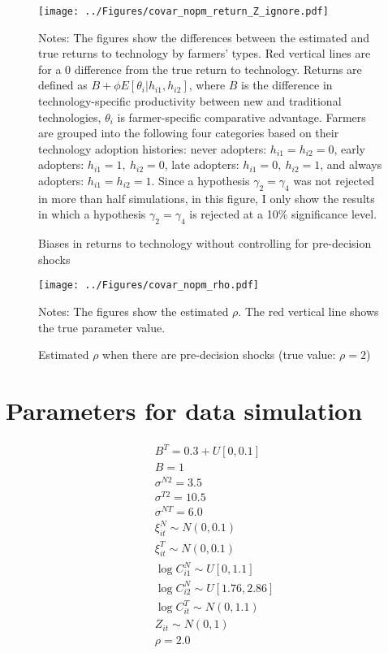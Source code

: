 \documentclass[11pt,letterpaper]{article}
\begin{document}
\begin{figure}[H]
  \centering
  \caption{Biases in returns to technology without controlling for pre-decision shocks}
  \texttt{[image: ../Figures/covar\_nopm\_return\_Z\_ignore.pdf]}
  \label{fig:covar_nopm_return_Z_ignore}
  \footnotesize
  \begin{tablenotes}
    \item Notes:
      The figures show the differences between the estimated and true returns to technology by farmers' types.
      Red vertical lines are for a 0 difference from the true return to technology.
      Returns are defined as $B + \phi E[\theta_i | h_{i1}, h_{i2}]$, where $B$ is the difference in technology-specific productivity between new and traditional technologies, $\theta_i$ is farmer-specific comparative advantage.
      Farmers are grouped into the following four categories based on their technology adoption histories:
      never adopters: $h_{i1} = h_{i2} = 0$, 
      early adopters: $h_{i1} = 1, \ h_{i2} = 0$, 
      late adopters: $h_{i1} = 0, \ h_{i2} = 1$, and
      always adopters: $h_{i1} = h_{i2} = 1$.
      Since a hypothesis $\gamma_2 = \gamma_4$ was not rejected in more than half simulations, in this figure, I only show the results in which a hypothesis $\gamma_2 = \gamma_4$ is rejected at a 10\% significance level.
  \end{tablenotes}
\end{figure}

\begin{figure}[H]
  \centering
  \caption{Estimated $\rho$ when there are pre-decision shocks (true value: $\rho = 2$)}
  \texttt{[image: ../Figures/covar\_nopm\_rho.pdf]}
  \label{fig:covar_nopm_rho}
  \footnotesize
  \begin{tablenotes}
    \item Notes:
      The figures show the estimated $\rho$.
      The red vertical line shows the true parameter value.
  \end{tablenotes}
\end{figure}

\section{Parameters for data simulation}

\begin{align*}
  &B^T = 0.3 + U[0, 0.1] \\
  &B = 1 \\
  &\sigma^{N2} = 3.5 \\ 
  &\sigma^{T2} = 10.5 \\ 
  &\sigma^{NT} = 6.0 \\ 
  &\xi_{it}^N \sim N(0, 0.1) \\
  &\xi_{it}^T \sim N(0, 0.1) \\
  &\log C_{i1}^N \sim U[0, 1.1] \\
  &\log C_{i2}^N \sim U[1.76, 2.86] \\
  &\log C_{it}^T \sim N(0, 1.1) \\
  &Z_{it} \sim N(0, 1) \\
  &\rho = 2.0
\end{align*}

  
\end{document}
